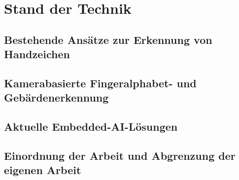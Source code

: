 \chapter{Stand der Technik}

\section{Bestehende Ansätze zur Erkennung von Handzeichen}
\section{Kamerabasierte Fingeralphabet- und Gebärdenerkennung}
\section{Aktuelle Embedded-AI-Lösungen}
\section{Einordnung der Arbeit und Abgrenzung der eigenen Arbeit}
